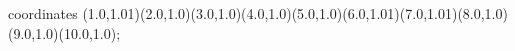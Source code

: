 					coordinates { (1.0,1.01)(2.0,1.0)(3.0,1.0)(4.0,1.0)(5.0,1.0)(6.0,1.01)(7.0,1.01)(8.0,1.0)(9.0,1.0)(10.0,1.0)};